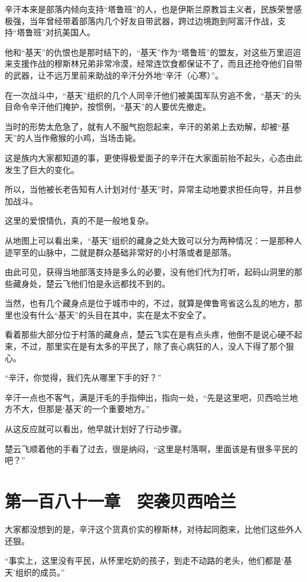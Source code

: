 辛汗本来是部落内倾向支持“塔鲁班”的人，也是伊斯兰原教旨主义者，民族荣誉感极强，当年曾经带着部落内几个好友自带武器，跨过边境跑到阿富汗作战，支持“塔鲁班”对抗美国人。

他和“基天”的仇恨也是那时结下的，“基天”作为“塔鲁班”的盟友，对这些万里迢迢来支援作战的穆斯林兄弟非常冷漠，经常连饮食都保证不了，而且还抢夺他们自带的武器，让不远万里前来助战的辛汗分外地“辛汗（心寒）”。

在一次战斗中，“基天”组织的几个人同辛汗他们被美国军队穷追不舍，“基天”的头目命令辛汗他们掩护，按惯例，“基天”的人要优先撤走。

当时的形势太危急了，就有人不服气抱怨起来，辛汗的弟弟上去劝解，却被“基天”的人当作儆猴的小鸡，当场击毙。

这是族内大家都知道的事，更使得极爱面子的辛汗在大家面前抬不起头，心态由此发生了巨大的变化。

所以，当他被长老告知有人计划对付“基天”时，异常主动地要求担任向导，并且参加战斗。

这里的爱恨情仇，真的不是一般地复杂。

从地图上可以看出来，“基天”组织的藏身之处大致可以分为两种情况：一是那种人迹罕至的山脉中，二就是群众基础非常好的小村落或者是部落。

由此可见，获得当地部落支持是多么的必要，没有他们代为打听，起码山洞里的那些藏身处，楚云飞他们怕是永远都找不到的。

当然，也有几个藏身点是位于城市中的，不过，就算是俾鲁弯省这么乱的地方，那里也没有什么“基天”的头目在其中，实在是太不安全了。

看着那些大部分位于村落的藏身点，楚云飞实在是有点头疼，他倒不是说心硬不起来，不过，那里实在是有太多的平民了，除了丧心病狂的人，没人下得了那个狠心。

“辛汗，你觉得，我们先从哪里下手的好？”

辛汗一点也不客气，满是汗毛的手指伸出，指向一处，“先是这里吧，贝西哈兰地方不大，但那是‘基天’的一个重要地方。”

从这反应就可以看出，他早就计划好了行动步骤。

楚云飞顺着他的手看了过去，很是纳闷，“这里是村落啊，里面该是有很多平民的吧？”

\section{第一百八十一章　突袭贝西哈兰}

大家都没想到的是，辛汗这个货真价实的穆斯林，对待起同胞来，比他们这些外人还狠。

“事实上，这里没有平民，从怀里吃奶的孩子，到走不动路的老头，他们都是‘基天’组织的成员。”

